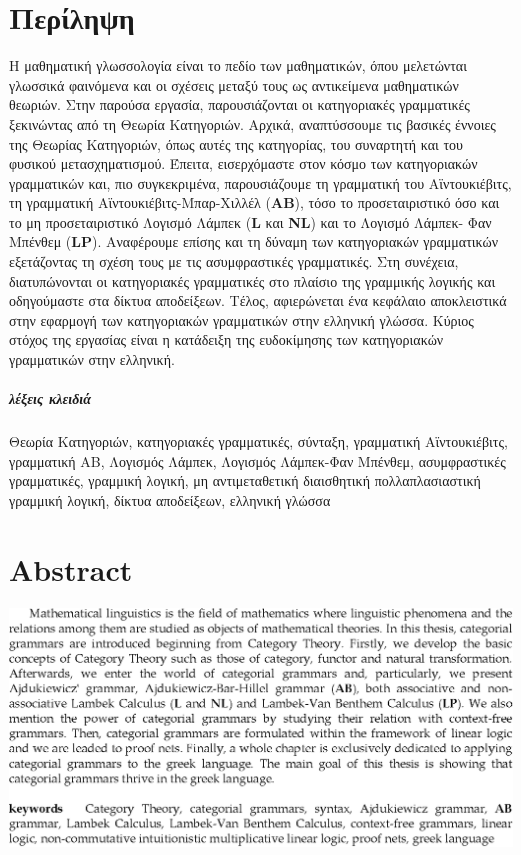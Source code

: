 \documentclass [a4paper,11pt] {book}
\theoremstyle{definition}
\theoremstyle{definition}
\begin{document}
\restoregeometry
\cleardoublepage
{}

\chapter*{\centering Περίληψη}
Η μαθηματική γλωσσολογία είναι το πεδίο των μαθηματικών, όπου μελετώνται γλωσσικά φαινόμενα και οι σχέσεις μεταξύ τους ως αντικείμενα μαθηματικών θεωριών. Στην παρούσα εργασία, παρουσιάζονται οι κατηγοριακές γραμματικές ξεκινώντας από τη Θεωρία Κατηγοριών. Αρχικά, αναπτύσσουμε τις βασικές έννοιες της Θεωρίας Κατηγοριών, όπως αυτές της κατηγορίας, του συναρτητή και του φυσικού μετασχηματισμού. Έπειτα, εισερχόμαστε στον κόσμο των κατηγοριακών γραμματικών και, πιο συγκεκριμένα, παρουσιάζουμε τη γραμματική του Αϊντουκιέβιτς, τη γραμματική Αϊντουκιέβιτς-Μπαρ-Χιλλέλ (\textbf{AB}), τόσο το προσεταιριστικό όσο και το μη προσεταιριστικό Λογισμό Λάμπεκ (\textbf{L} και \textbf{NL}) και το Λογισμό Λάμπεκ- Φαν Μπένθεμ (\textbf{LP}). Αναφέρουμε επίσης και τη δύναμη των κατηγοριακών γραμματικών εξετάζοντας τη σχέση τους με τις ασυμφραστικές γραμματικές. Στη συνέχεια, διατυπώνονται οι κατηγοριακές γραμματικές στο πλαίσιο της γραμμικής λογικής και οδηγούμαστε στα δίκτυα αποδείξεων. Τέλος, αφιερώνεται ένα κεφάλαιο αποκλειστικά στην εφαρμογή των κατηγοριακών γραμματικών στην ελληνική γλώσσα. Κύριος στόχος της εργασίας είναι η κατάδειξη της ευδοκίμησης των κατηγοριακών γραμματικών στην ελληνική.\paragraph{λέξεις κλειδιά}Θεωρία Κατηγοριών, κατηγοριακές γραμματικές, σύνταξη, γραμματική Αϊντουκιέβιτς, γραμματική ΑΒ, Λογισμός Λάμπεκ, Λογισμός Λάμπεκ-Φαν Μπένθεμ, ασυμφραστικές γραμματικές, γραμμική λογική, μη αντιμεταθετική διαισθητική πολλαπλασιαστική γραμμική λογική, δίκτυα αποδείξεων, ελληνική γλώσσα
\chapter*{\centering Abstract}


\begin{center}
\includegraphics[scale=1]{abstract}
\end{center}
\end{document}
